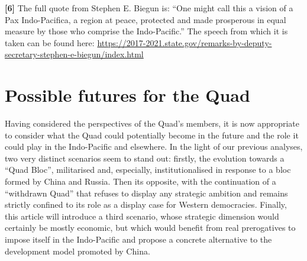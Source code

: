 \documentclass[11pt,a4paper]{article}
\begin{document}
\textbf{{[}6{]}} The full quote from Stephen E. Biegun is: “One might call this a vision of a Pax Indo-Pacifica, a region at peace, protected and made prosperous in equal measure by those who comprise the Indo-Pacific.” The speech from which it is taken can be found here: \url{https://2017-2021.state.gov/remarks-by-deputy-secretary-stephen-e-biegun/index.html}

\section{Possible futures for the Quad}

Having considered the perspectives of the Quad’s members, it is now appropriate to consider what the Quad could potentially become in the future and the role it could play in the Indo-Pacific and elsewhere. In the light of our previous analyses, two very distinct scenarios seem to stand out: firstly, the evolution towards a “Quad Bloc”, militarised and, especially, institutionalised in response to a bloc formed by China and Russia. Then its opposite, with the continuation of a “withdrawn Quad” that refuses to display any strategic ambition and remains strictly confined to its role as a display case for Western democracies. Finally, this article will introduce a third scenario, whose strategic dimension would certainly be mostly economic, but which would benefit from real prerogatives to impose itself in the Indo-Pacific and propose a concrete alternative to the development model promoted by China.
\end{document}
